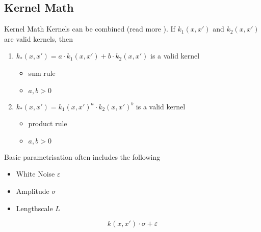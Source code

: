 \documentclass{beamer}
\begin{document}
\subsection{Kernel Math}
\begin{frame}{Kernel Math}
    Kernels can be combined (read more \cite{arxiv.0911.5367}). If $k_1(x, x')$ and $k_2(x, x')$ are valid kernels, then
    \begin{enumerate}
        \item $k_*(x, x') = a\cdot k_1(x, x') + b \cdot k_2(x, x')$ is a valid kernel\begin{itemize}
            \item sum rule
            \item $a,b>0$
        \end{itemize}
        \item $k_*(x, x') = k_1(x, x')^a \cdot k_2(x, x')^b$ is a valid kernel\begin{itemize}
            \item product rule
            \item $a,b>0$
        \end{itemize} 
    \end{enumerate}
\pause
Basic parametrisation often includes the following
\begin{itemize}
    \item White Noise $\varepsilon$
    \item Amplitude $\sigma$
    \item Lengthscale $L$
\end{itemize}
\begin{equation*}
    k(x, x') \cdot \sigma + \varepsilon 
\end{equation*}
\end{frame}
\end{document}
